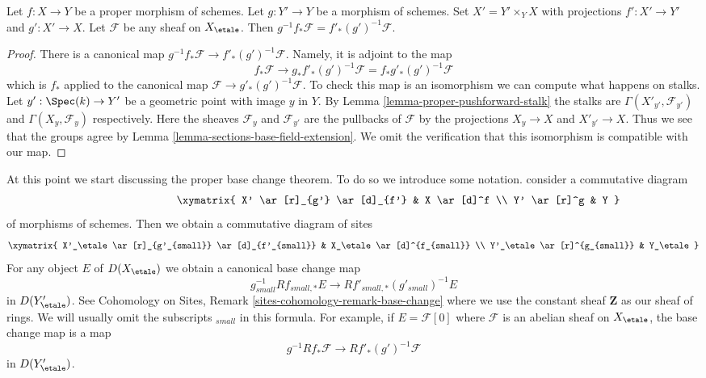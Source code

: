 \begin{lemma}
\label{lemma-proper-base-change-f-star}
Let $f : X \to Y$ be a proper morphism of schemes. Let $g : Y' \to Y$
be a morphism of schemes. Set $X' = Y' \times_Y X$ with projections
$f' : X' \to Y'$ and $g' : X' \to X$. Let $\mathcal{F}$ be any sheaf on
$X_\etale$. Then $g^{-1}f_*\mathcal{F} = f'_*(g')^{-1}\mathcal{F}$.
\end{lemma}

\begin{proof}
There is a canonical map $g^{-1}f_*\mathcal{F} \to f'_*(g')^{-1}\mathcal{F}$.
Namely, it is adjoint to the map
$$
f_*\mathcal{F} \longrightarrow
g_*f'_*(g')^{-1}\mathcal{F} = f_*g'_*(g')^{-1}\mathcal{F}
$$
which is $f_*$ applied to the canonical map
$\mathcal{F} \to g'_*(g')^{-1}\mathcal{F}$. To check this map is an
isomorphism we can compute what happens on stalks.
Let $y' : \Spec(k) \to Y'$ be a geometric point with image $y$ in $Y$.
By Lemma \ref{lemma-proper-pushforward-stalk} the stalks are
$\Gamma(X'_{y'}, \mathcal{F}_{y'})$ and $\Gamma(X_y, \mathcal{F}_y)$
respectively. Here the sheaves $\mathcal{F}_y$ and $\mathcal{F}_{y'}$
are the pullbacks of $\mathcal{F}$ by the projections $X_y \to X$
and $X'_{y'} \to X$. Thus we see that the groups agree by
Lemma \ref{lemma-sections-base-field-extension}. We omit the
verification that this isomorphism is compatible with our map.
\end{proof}


\noindent
At this point we start discussing the proper base change theorem.
To do so we introduce some notation. consider a commutative diagram
\begin{equation}
\label{equation-base-change-diagram}
\vcenter{
\xymatrix{
X' \ar[r]_{g'} \ar[d]_{f'} & X \ar[d]^f \\
Y' \ar[r]^g & Y
}
}
\end{equation}
of morphisms of schemes. Then we obtain a commutative diagram of sites
$$
\xymatrix{
X'_\etale \ar[r]_{g'_{small}} \ar[d]_{f'_{small}} &
X_\etale \ar[d]^{f_{small}} \\
Y'_\etale \ar[r]^{g_{small}} &
Y_\etale
}
$$
For any object $E$ of $D(X_\etale)$ we obtain a canonical base change map
\begin{equation}
\label{equation-base-change}
g_{small}^{-1}Rf_{small, *}E \longrightarrow Rf'_{small, *}(g'_{small})^{-1}E
\end{equation}
in $D(Y'_\etale)$. See Cohomology on Sites, Remark
\ref{sites-cohomology-remark-base-change} where we use the constant
sheaf $\mathbf{Z}$ as our sheaf of rings.
We will usually omit the subscripts ${}_{small}$ in this formula.
For example, if $E = \mathcal{F}[0]$ where $\mathcal{F}$ is an abelian
sheaf on $X_\etale$, the base change map is a map
\begin{equation}
\label{equation-base-change-sheaf}
g^{-1}Rf_*\mathcal{F} \longrightarrow Rf'_*(g')^{-1}\mathcal{F}
\end{equation}
in $D(Y'_\etale)$.

